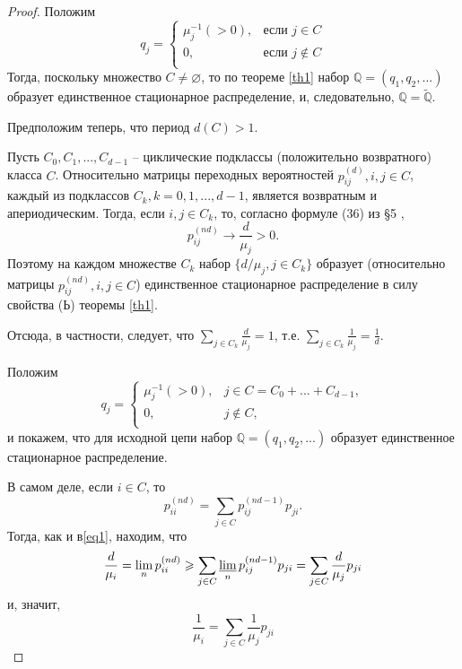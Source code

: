 \begin{theorem}
\begin{proof}
Положим
\begin{equation}\label{eq5}
q_j =
  \begin{cases}
    \mu_j^{-1} (> 0), & \text{если $j \in C$}\\
    0, & \text{если $j \notin C$}\\
  \end{cases} 
\end{equation}
Тогда, поскольку множество $C \neq \varnothing$, то по теореме \ref{th1} набор $\mathbb{Q} = (q_1, q_2, ...)$ образует единственное стационарное распределение, и, следовательно, $\mathbb{Q} = \widetilde{\mathbb{Q}}$.

Предположим теперь, что период $d(C) > 1$.

Пусть $C_0, C_1, ..., C_{d-1}$ -- циклические подклассы (положительно возвратного) класса $C$. Относительно матрицы переходных вероятностей $p_{ij}^{(d)}, i, j \in C$, каждый из подклассов $C_k, k = 0, 1, ..., d - 1$, является возвратным и апериодическим. Тогда, если $i, j \in C_k$, то, согласно формуле (36) из \S 5 \cite{shir2},
$$
p_{ij}^{(nd)} \rightarrow \frac{d}{\mu_j} > 0.
$$
Поэтому на каждом множестве $C_k$ набор $\{d / \mu_j, j \in C_k\}$ образует 
(относительно матрицы $p_{ij}^{(nd)}, i, j \in C$) единственное стационарное распределение в силу свойства (Ь) теоремы \ref{th1}.

Отсюда, в частности, следует, что $\sum\limits_{j \in C_k} \frac{d}{\mu_j} = 1$, т.е. $\sum\limits_{j \in C_k} \frac{1}{\mu_j} = \frac{1}{d}$.

Положим
\begin{equation}\label{eq6}
q_j =
  \begin{cases}
    \mu_j^{-1} (> 0), & j \in C = C_0 + ... + C_{d - 1},\\
    0, & j \notin C,\\
  \end{cases} 
\end{equation}
и покажем, что для исходной цепи набор $\mathbb{Q} = (q_1, q_2, ...)$ образует 
единственное стационарное распределение.

В самом деле, если $i \in C$, то
$$
p_{ii}^{(nd)} = \sum\limits_{j \in C} p_{ij}^{(nd - 1)} p_{ji}.
$$
Тогда, как и в\eqref{eq1}, находим, что
$$
\frac{d}{\mu_i} = \lim_n p_{ii}^{(nd)} \geq \sum_{j \in C} \varliminf_n p_{ij}^{(nd - 1)} p_{ji} = \sum_{j \in C} \frac{d}{\mu_j} p_{ji}
$$
и, значит,
\begin{equation}\label{eq7}
\frac{1}{\mu_i} = \sum_{j \in C} \frac{1}{\mu_j} p_{ji}  
\end{equation}


\end{proof}
\end{theorem}
